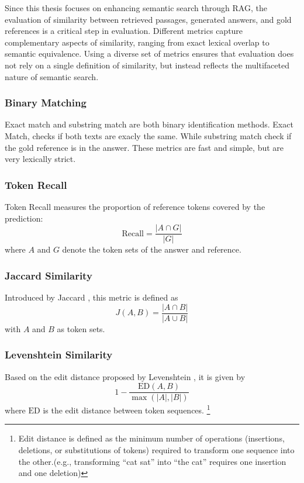 Since this thesis focuses on enhancing semantic search through \gls{RAG}, the evaluation of similarity between retrieved passages, generated answers, and gold references is a critical step in evaluation. Different metrics capture complementary aspects of similarity, ranging from exact lexical overlap to semantic equivalence. Using a diverse set of metrics ensures that evaluation does not rely on a single definition of similarity, but instead reflects the multifaceted nature of semantic search.
\subsubsection{Binary Matching}
Exact match and substring match are both binary identification methods. Exact Match, checks if both texts are exacly the same. While substring match check if the gold reference is in the answer. These metrics are fast and simple, but are very lexically strict.

\subsubsection{Token Recall} 
Token Recall measures the proportion of reference tokens covered by the prediction:
\[
\text{Recall} = \frac{|A \cap G|}{|G|}
\]
where \(A\) and \(G\) denote the token sets of the answer and reference.  

\subsubsection{Jaccard Similarity} 
Introduced by Jaccard \cite{jaccard1901distribution}, this metric is defined as
\[
J(A,B) = \frac{|A \cap B|}{|A \cup B|}
\]
with \(A\) and \(B\) as token sets.  

\subsubsection{Levenshtein Similarity} 
Based on the edit distance proposed by Levenshtein \cite{levenshtein1966binary}, it is given by
\[
1 - \frac{\text{ED}(A,B)}{\max(|A|,|B|)}
\]
where \(\text{ED}\) is the edit distance between token sequences.  
\footnote{Edit distance is defined as the minimum number of operations (insertions, deletions, or substitutions of tokens) required to transform one sequence into the other.(e.g., transforming “cat sat” into “the cat” requires one insertion and one deletion)}

